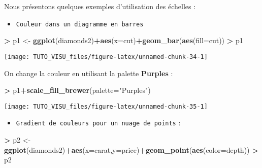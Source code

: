 \documentclass[]{book}
\newenvironment{Shaded}{\begin{snugshade}}{\end{snugshade}}
\newcommand{\DataTypeTok}[1]{\textcolor[rgb]{0.13,0.29,0.53}{#1}}
\newcommand{\KeywordTok}[1]{\textcolor[rgb]{0.13,0.29,0.53}{\textbf{#1}}}
\newcommand{\NormalTok}[1]{#1}
\newcommand{\OperatorTok}[1]{\textcolor[rgb]{0.81,0.36,0.00}{\textbf{#1}}}
\newcommand{\StringTok}[1]{\textcolor[rgb]{0.31,0.60,0.02}{#1}}
\providecommand{\tightlist}{%
  \setlength{\itemsep}{0pt}\setlength{\parskip}{0pt}}
\theoremstyle{definition}
\theoremstyle{definition}
\theoremstyle{definition}
\theoremstyle{remark}
\begin{document}
Nous présentons quelques exemples d'utilisation des échelles :

\begin{itemize}
\tightlist
\item
  \texttt{Couleur\ dans\ un\ diagramme\ en\ barres}
\end{itemize}

\begin{Shaded}
\begin{Highlighting}[]
\OperatorTok{>}\StringTok{ }\NormalTok{p1 <-}\StringTok{ }\KeywordTok{ggplot}\NormalTok{(diamonds2)}\OperatorTok{+}\KeywordTok{aes}\NormalTok{(}\DataTypeTok{x=}\NormalTok{cut)}\OperatorTok{+}\KeywordTok{geom_bar}\NormalTok{(}\KeywordTok{aes}\NormalTok{(}\DataTypeTok{fill=}\NormalTok{cut))}
\OperatorTok{>}\StringTok{ }\NormalTok{p1}
\end{Highlighting}
\end{Shaded}

\begin{center}\texttt{[image: TUTO\_VISU\_files/figure-latex/unnamed-chunk-34-1]} \end{center}

On change la couleur en utilisant la palette \textbf{Purples} :

\begin{Shaded}
\begin{Highlighting}[]
\OperatorTok{>}\StringTok{ }\NormalTok{p1}\OperatorTok{+}\KeywordTok{scale_fill_brewer}\NormalTok{(}\DataTypeTok{palette=}\StringTok{"Purples"}\NormalTok{)}
\end{Highlighting}
\end{Shaded}

\begin{center}\texttt{[image: TUTO\_VISU\_files/figure-latex/unnamed-chunk-35-1]} \end{center}

\begin{itemize}
\tightlist
\item
  \texttt{Gradient\ de\ couleurs\ pour\ un\ nuage\ de\ points} :
\end{itemize}

\begin{Shaded}
\begin{Highlighting}[]
\OperatorTok{>}\StringTok{ }\NormalTok{p2 <-}\StringTok{ }\KeywordTok{ggplot}\NormalTok{(diamonds2)}\OperatorTok{+}\KeywordTok{aes}\NormalTok{(}\DataTypeTok{x=}\NormalTok{carat,}\DataTypeTok{y=}\NormalTok{price)}\OperatorTok{+}\KeywordTok{geom_point}\NormalTok{(}\KeywordTok{aes}\NormalTok{(}\DataTypeTok{color=}\NormalTok{depth))}
\OperatorTok{>}\StringTok{ }\NormalTok{p2}
\end{Highlighting}
\end{Shaded}
\end{document}
